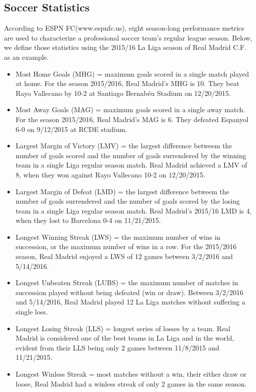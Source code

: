 \documentclass[inte,blindrev]{informs3}
\begin{document}
\subsection*{Soccer Statistics}
According to ESPN FC(www.espnfc.us), eight season-long performance metrics are used to characterize a professional soccer team's regular league season. Below, we define those statistics using the 2015/16 La Liga season of Real Madrid C.F. as an example.
\begin{itemize}
\item Most Home Goals (MHG) = maximum goals scored in a single match played at home. For the season 2015/2016, Real Madrid’s MHG is 10. They beat Rayo Vallecano by 10-2 at Santiago Bernabéu Stadium on 12/20/2015.
\item Most Away Goals (MAG) = maximum goals scored in a single away match. For the season 2015/2016, Real Madrid’s MAG is 6. They defeated Espanyol 6-0 on 9/12/2015 at RCDE stadium.
\item Largest Margin of Victory (LMV) = the largest difference betweem the number of goals scored and the number of goals surrendered by the winning team in a single Liga regular season match. Real Madrid achieved a LMV of 8, when they won against Rayo Vallecano 10-2 on 12/20/2015.
\item Largest Margin of Defeat (LMD) = the largest difference betweem the number of goals surrendered and the number of goals scored by the losing team in a single Liga regular season match. Real Madrid's 2015/16 LMD is 4, when they lost to Barcelona 0-4 on 11/21/2015.
\item Longest Winning Streak (LWS) = the maximum number of wins in succession, or the maximum number of wins in a row. For the 2015/2016 season, Real Madrid enjoyed a LWS of 12 games between 3/2/2016 and 5/14/2016.
\item Longest Unbeaten Streak (LUBS) = the maximum number of matches in succession played without being defeated (win or draw). Between 3/2/2016 and 5/14/2016, Real Madrid played 12 La Liga matches without suffering a single loss.
\item Longest Losing Streak (LLS) = longest series of losses by a team. Real Madrid is considered one of the best teams in La Liga and in the world, evident from their LLS being only 2 games between 11/8/2015 and 11/21/2015.
\item Longest Winless Streak = most matches without a win, their either draw or loose, Real Madrid had a winless streak of only 2 games in the same season.
\end{itemize} 
\end{document}
